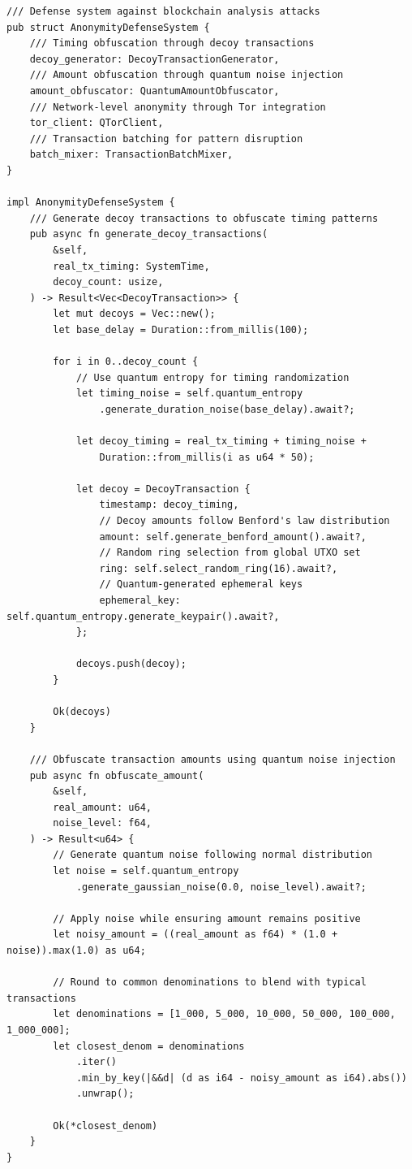 \documentclass[11pt,a4paper]{article}
\begin{document}
\begin{lstlisting}[caption=Multi-layered Anonymity Defense System]
/// Defense system against blockchain analysis attacks
pub struct AnonymityDefenseSystem {
    /// Timing obfuscation through decoy transactions
    decoy_generator: DecoyTransactionGenerator,
    /// Amount obfuscation through quantum noise injection
    amount_obfuscator: QuantumAmountObfuscator,
    /// Network-level anonymity through Tor integration
    tor_client: QTorClient,
    /// Transaction batching for pattern disruption
    batch_mixer: TransactionBatchMixer,
}

impl AnonymityDefenseSystem {
    /// Generate decoy transactions to obfuscate timing patterns
    pub async fn generate_decoy_transactions(
        &self,
        real_tx_timing: SystemTime,
        decoy_count: usize,
    ) -> Result<Vec<DecoyTransaction>> {
        let mut decoys = Vec::new();
        let base_delay = Duration::from_millis(100);
        
        for i in 0..decoy_count {
            // Use quantum entropy for timing randomization
            let timing_noise = self.quantum_entropy
                .generate_duration_noise(base_delay).await?;
                
            let decoy_timing = real_tx_timing + timing_noise + 
                Duration::from_millis(i as u64 * 50);
                
            let decoy = DecoyTransaction {
                timestamp: decoy_timing,
                // Decoy amounts follow Benford's law distribution
                amount: self.generate_benford_amount().await?,
                // Random ring selection from global UTXO set
                ring: self.select_random_ring(16).await?,
                // Quantum-generated ephemeral keys
                ephemeral_key: self.quantum_entropy.generate_keypair().await?,
            };
            
            decoys.push(decoy);
        }
        
        Ok(decoys)
    }
    
    /// Obfuscate transaction amounts using quantum noise injection
    pub async fn obfuscate_amount(
        &self,
        real_amount: u64,
        noise_level: f64,
    ) -> Result<u64> {
        // Generate quantum noise following normal distribution
        let noise = self.quantum_entropy
            .generate_gaussian_noise(0.0, noise_level).await?;
            
        // Apply noise while ensuring amount remains positive
        let noisy_amount = ((real_amount as f64) * (1.0 + noise)).max(1.0) as u64;
        
        // Round to common denominations to blend with typical transactions
        let denominations = [1_000, 5_000, 10_000, 50_000, 100_000, 1_000_000];
        let closest_denom = denominations
            .iter()
            .min_by_key(|&&d| (d as i64 - noisy_amount as i64).abs())
            .unwrap();
            
        Ok(*closest_denom)
    }
}
\end{lstlisting}
\end{document}

